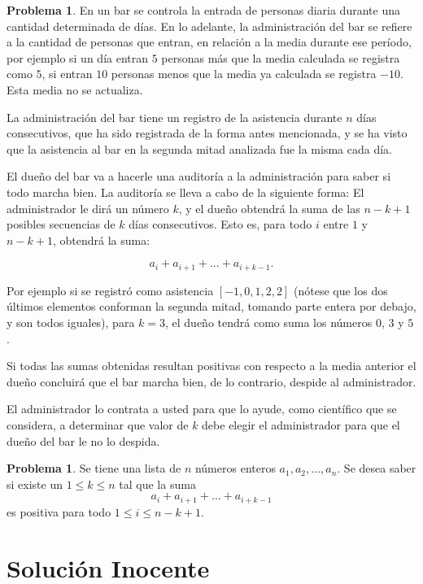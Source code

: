 \documentclass[10pt]{amsart}
\theoremstyle{definition}
\newtheorem{prob}[theorem]{Problema}
\numberwithin{equation}{section}
\begin{document}
	\begin{prob}
		
		En un bar se controla la entrada de personas diaria durante una cantidad determinada de días. En lo adelante, la administración del bar se refiere a la cantidad de personas que entran, en relación a la media durante ese período, por ejemplo si un día entran $5$ personas más que la media calculada se registra como $5$, si entran $10$ personas menos que la media ya calculada se registra $-10$. Esta media no se actualiza. 
		
		La administración del bar tiene un registro de la asistencia durante $n$ días consecutivos, que ha sido registrada de la forma antes mencionada, y se ha visto que la asistencia al bar en la segunda mitad analizada fue la misma cada día.
		
		El dueño del bar va a hacerle una auditoría a la administración para saber si todo marcha bien. La auditor\'ia se lleva a cabo de la siguiente forma: El administrador le dirá un número $k$, y el dueño 
		obtendr\'a la suma de las $n - k + 1$ posibles secuencias de $k$ d\'ias consecutivos. Esto es, para todo $i$ entre $1$ y $n - k + 1$, obtendr\'a la suma:
		
		$$a_i + a_{i+1} + ... + a_{i+k-1}. $$
		
		Por ejemplo si se registr\'o como asistencia $[-1, 0, 1, 2, 2]$ (n\'otese que los dos \'ultimos elementos conforman la segunda mitad, tomando parte entera por debajo, y son todos iguales), para $k = 3$, el dueño tendrá como suma los números $0$, $3$ y $5$.
		
		Si todas las sumas obtenidas resultan positivas con respecto a la media anterior el dueño concluir\'a que el bar marcha bien, de lo contrario, despide al administrador.
		
		El administrador lo contrata a usted para que lo ayude, como científico que se considera, a determinar que  valor de $k$ debe elegir el administrador para que el due\~no del bar le no lo despida.
	\end{prob}

	\begin{prob}
		Se tiene una lista de $n$ n\'umeros enteros $a_1, a_2, \dots, a_n$. Se desea saber si existe un $1 \le k \le n$ tal que la suma
		\[ a_i + a_{i + 1} + \dots + a_{i + k - 1}\]
		es positiva para todo $1\le i\le n - k + 1$.
	\end{prob}

	\section{Soluci\'on Inocente}
\end{document}
